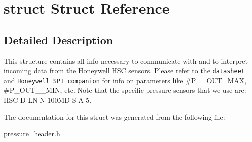 \hypertarget{structstruct}{\section{struct Struct Reference}
\label{structstruct}
}


\subsection{Detailed Description}
This structure contains all info necessary to communicate with and to interpret incoming data from the Honeywell H\-S\-C sensors. Please refer to the \href{http://sensing.honeywell.com/honeywell-sensing-trustability-hsc-series-high-accuracy-board-mount-pressure-sensors-50099148-a-en.pdf}{\tt datasheet} and \href{http://sensing.honeywell.com/spi-comms-digital-ouptu-pressure-sensors-tn-008202-3-en-final-30may12.pdf}{\tt Honeywell S\-P\-I companion} for info on parameters like \#\-P\-\_\-\-\_\-\-O\-U\-T\-\_\-\-M\-A\-X, \#\-P\-\_\-\-O\-U\-T\-\_\-\-\_\-\-M\-I\-N, etc. Note that the specific pressure sensors that we use are\-: H\-S\-C D L\-N N 100\-M\-D S A 5. 

The documentation for this struct was generated from the following file\-:\begin{DoxyCompactItemize}
\item 
\hyperlink{pressure__header_8h}{pressure\-\_\-header.\-h}\end{DoxyCompactItemize}
